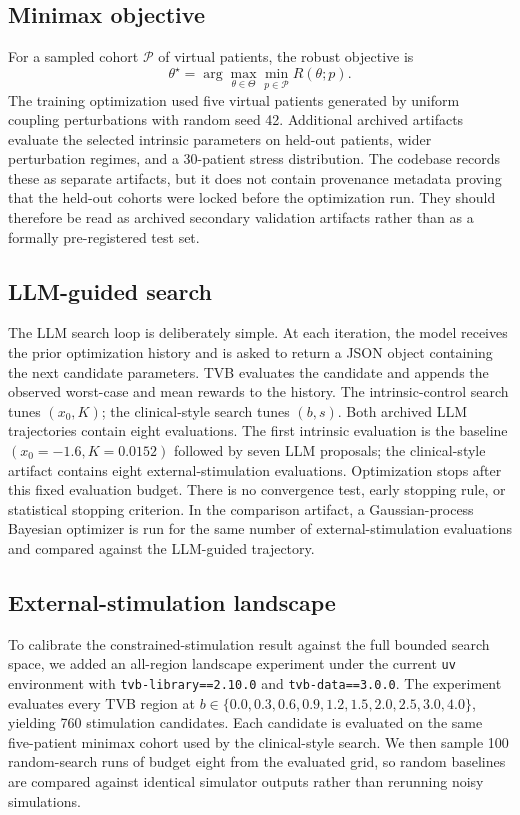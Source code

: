 \documentclass{article}
\begin{document}
\subsection{Minimax objective}
For a sampled cohort $\mathcal{P}$ of virtual patients, the robust objective is
\begin{equation}
  \theta^{\star}=\arg\max_{\theta\in\Theta}\min_{p\in\mathcal{P}}R(\theta;p).
\end{equation}
The training optimization used five virtual patients generated by uniform coupling perturbations with random seed 42. Additional archived artifacts evaluate the selected intrinsic parameters on held-out patients, wider perturbation regimes, and a 30-patient stress distribution. The codebase records these as separate artifacts, but it does not contain provenance metadata proving that the held-out cohorts were locked before the optimization run. They should therefore be read as archived secondary validation artifacts rather than as a formally pre-registered test set.

\subsection{LLM-guided search}
The LLM search loop is deliberately simple. At each iteration, the model receives the prior optimization history and is asked to return a JSON object containing the next candidate parameters. TVB evaluates the candidate and appends the observed worst-case and mean rewards to the history. The intrinsic-control search tunes $(x_0,K)$; the clinical-style search tunes $(b,s)$. Both archived LLM trajectories contain eight evaluations. The first intrinsic evaluation is the baseline $(x_0=-1.6,K=0.0152)$ followed by seven LLM proposals; the clinical-style artifact contains eight external-stimulation evaluations. Optimization stops after this fixed evaluation budget. There is no convergence test, early stopping rule, or statistical stopping criterion. In the comparison artifact, a Gaussian-process Bayesian optimizer is run for the same number of external-stimulation evaluations and compared against the LLM-guided trajectory.

\subsection{External-stimulation landscape}
To calibrate the constrained-stimulation result against the full bounded search space, we added an all-region landscape experiment under the current \texttt{uv} environment with \texttt{tvb-library==2.10.0} and \texttt{tvb-data==3.0.0}. The experiment evaluates every TVB region at $b\in\{0.0,0.3,0.6,0.9,1.2,1.5,2.0,2.5,3.0,4.0\}$, yielding 760 stimulation candidates. Each candidate is evaluated on the same five-patient minimax cohort used by the clinical-style search. We then sample 100 random-search runs of budget eight from the evaluated grid, so random baselines are compared against identical simulator outputs rather than rerunning noisy simulations.
\end{document}
